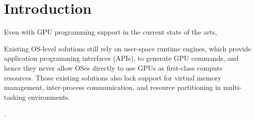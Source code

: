 \section{Introduction}
\label{sec:introduction}

Even with GPU programming support in the current state of the arts, 

Existing OS-level solutions still rely on user-space runtime
engines, which provide application programming interfaces (APIs), to
generate GPU commands, and hence they never allow OSes directly to use
GPUs as first-class compute resources.
Those existing solutions also lack support for virtual memory
management, inter-process communication, and resource partitioning in
multi-tasking environments.

\cite{Kato_RTSS11}.